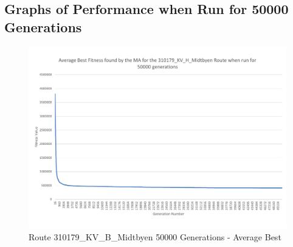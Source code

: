 



\subsection{Graphs of Performance when Run for 50000 Generations} %
\label{sub:graphs_of_performance_when_run_for_50000_generations_KV_H}

\begin{landscape}
\begin{figure}[thbp]
	\centerline{\includegraphics[height=0.945\textwidth]{figures/Trondheim_graphs/KV_H/KV_H-all_average_best.pdf}}
	\caption{Route 310179\_KV\_B\_Midtbyen 50000 Generations - Average Best}
	\label{fig:KV_H_50k_ab}
\end{figure}
\end{landscape}


